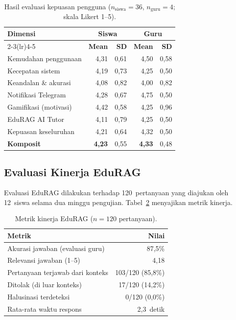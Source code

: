 \documentclass[12pt,a4paper]{article}
\newcommand{\edurag}{EduRAG}
\begin{document}
\begin{table}[htbp]
\centering
\caption{Hasil evaluasi kepuasan pengguna ($n_{\text{siswa}}=36$,
         $n_{\text{guru}}=4$; skala Likert 1--5).}
\label{tab:kepuasan}
\small
\renewcommand{\arraystretch}{1.15}
\begin{tabular}{lrrrr}
\toprule
\textbf{Dimensi} &
  \multicolumn{2}{c}{\textbf{Siswa}} &
  \multicolumn{2}{c}{\textbf{Guru}} \\
\cmidrule(lr){2-3}\cmidrule(lr){4-5}
& \textbf{Mean} & \textbf{SD} & \textbf{Mean} & \textbf{SD} \\
\midrule
Kemudahan penggunaan          & 4,31 & 0,61 & 4,50 & 0,58 \\
Kecepatan sistem              & 4,19 & 0,73 & 4,25 & 0,50 \\
Keandalan \& akurasi          & 4,08 & 0,82 & 4,00 & 0,82 \\
Notifikasi Telegram           & 4,28 & 0,67 & 4,75 & 0,50 \\
Gamifikasi (motivasi)         & 4,42 & 0,58 & 4,25 & 0,96 \\
\edurag{} AI Tutor            & 4,11 & 0,79 & 4,25 & 0,50 \\
Kepuasan keseluruhan          & 4,21 & 0,64 & 4,32 & 0,50 \\
\midrule
\textbf{Komposit}             & \textbf{4,23} & 0,55 &
  \textbf{4,33} & 0,48 \\
\bottomrule
\end{tabular}
\end{table}

\subsection{Evaluasi Kinerja \edurag{}}

Evaluasi \edurag{} dilakukan terhadap 120~pertanyaan yang
diajukan oleh 12~siswa selama dua minggu pengujian.
Tabel~\ref{tab:edurag} menyajikan metrik kinerja.

\begin{table}[htbp]
\centering
\caption{Metrik kinerja \edurag{} ($n=120$ pertanyaan).}
\label{tab:edurag}
\small
\renewcommand{\arraystretch}{1.15}
\begin{tabular}{lr}
\toprule
\textbf{Metrik} & \textbf{Nilai} \\
\midrule
Akurasi jawaban (evaluasi guru) & 87,5\% \\
Relevansi jawaban (1--5)        & 4,18 \\
Pertanyaan terjawab dari konteks& 103/120 (85,8\%) \\
Ditolak (di luar konteks)       & 17/120 (14,2\%) \\
Halusinasi terdeteksi           & 0/120 (0,0\%) \\
Rata-rata waktu respons         & 2,3~detik \\
\bottomrule
\end{tabular}
\end{table}
\end{document}
